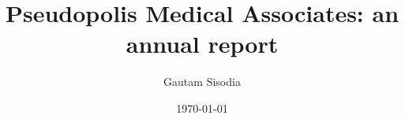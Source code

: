 \documentclass[11pt]{amsart}
\begin{document}
\title[PMA annual report]{Pseudopolis Medical Associates: an annual report}
\date{\today}
\author{Gautam Sisodia}
\maketitle
\end{document}

